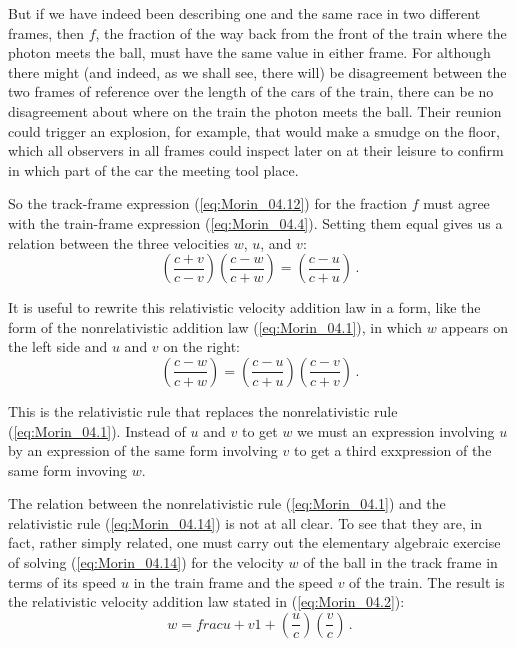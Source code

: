 But if we have indeed been describing one and the same race in two different frames, then $f$, the fraction of the way back from the front of the train where the photon meets the ball, must have the same value in either frame. For although there might (and indeed, as we shall see, there will) be disagreement between the two frames of reference over the length of the cars of the train, there can be no disagreement about where on the train the photon meets the ball. Their reunion could trigger an explosion, for example, that would make a smudge on the floor, which all observers in all frames could inspect later on at their leisure to confirm in which part of the car the meeting tool place. 

So the track-frame expression (\ref{eq:Morin_04.12}) for the fraction $f$ must agree with the train-frame expression (\ref{eq:Morin_04.4}). Setting them equal gives us a relation between the three velocities $w$, $u$, and $v$:
\begin{equation}\label{eq:Morin_04.13}
\left( \frac{c + v}{c - v} \right)\left( \frac{c - w}{c + w} \right) = \left( \frac{c - u}{c + u} \right)\,.
\end{equation}

It is useful to rewrite this relativistic velocity addition law in a form, like the form of the nonrelativistic addition law (\ref{eq:Morin_04.1}), in which $w$ appears on the left side and $u$ and $v$ on the right:
\begin{equation}\label{eq:Morin_04.14}
\left( \frac{c - w}{c + w} \right) = \left( \frac{c - u}{c + u} \right)  \left( \frac{c - v}{c + v} \right)\,.
\end{equation}

This is the relativistic rule that replaces the nonrelativistic rule (\ref{eq:Morin_04.1}). Instead of  $u$ and $v$ to get $w$ we must  an expression involving $u$ by an expression of the same form involving $v$ to get a third exxpression of the same form invoving $w$. 

The relation between the nonrelativistic rule (\ref{eq:Morin_04.1}) and the relativistic rule (\ref{eq:Morin_04.14}) is not at all clear. To see that they are, in fact, rather simply related, one must carry out the elementary algebraic exercise of solving (\ref{eq:Morin_04.14}) for the velocity $w$ of the ball in the track frame in terms of its speed $u$ in the train frame and the speed $v$ of the train. The result is the relativistic velocity addition law stated in (\ref{eq:Morin_04.2}):
\begin{equation}\label{eq:Morin_04.15}
w = frac{u + v}{1 + \left( \frac{u}{c}\right) \left( \frac{v}{c}\right)}\,.
\end{equation}

